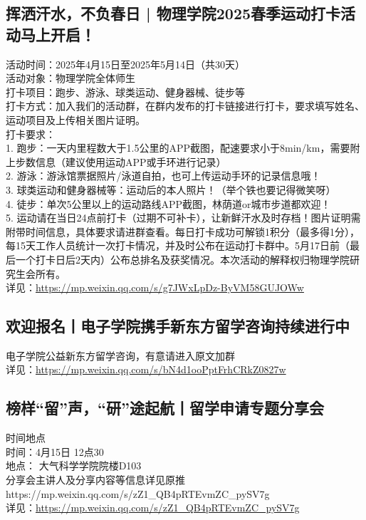 \documentclass[letterpaper, 12pt]{article}
\begin{document}
\begin{multicols}{2}
\subsection{挥洒汗水，不负春日 | 物理学院2025春季运动打卡活动马上开启！}
活动时间：2025年4月15日至2025年5月14日（共30天）
\\活动对象：物理学院全体师生
\\打卡项目：跑步、游泳、球类运动、健身器械、徒步等
\\打卡方式：加入我们的活动群，在群内发布的打卡链接进行打卡，要求填写姓名、运动项目及上传相关图片证明。
\\打卡要求：
\\1. 跑步：一天内里程数大于1.5公里的APP截图，配速要求小于8min/km，需要附上步数信息（建议使用运动APP或手环进行记录）
\\2. 游泳：游泳馆票据照片/泳道自拍，也可上传运动手环的记录信息哦！
\\3. 球类运动和健身器械等：运动后的本人照片！（举个铁也要记得微笑呀）
\\4. 徒步：单次5公里以上的运动路线APP截图，林荫道or城市步道都欢迎！
\\5. 运动请在当日24点前打卡（过期不可补卡），让新鲜汗水及时存档！图片证明需附带时间信息，具体要求请进群查看。每日打卡成功可解锁1积分（最多得1分），每15天工作人员统计一次打卡情况，并及时公布在运动打卡群中。5月17日前（最后一个打卡日后2天内）公布总排名及获奖情况。本次活动的解释权归物理学院研究生会所有。
\\详见：\url{https://mp.weixin.qq.com/s/g7JWxLpDz-ByVM58GUJOWw}

\subsection{欢迎报名丨电子学院携手新东方留学咨询持续进行中}
电子学院公益新东方留学咨询，有意请进入原文加群
\\详见：\url{https://mp.weixin.qq.com/s/bN4d1ooPptFrhCRkZ0827w}

\subsection{榜样“留”声，“研”途起航丨留学申请专题分享会}
时间地点
\\时间：4月15日 12点30
\\地点： 大气科学学院院楼D103
\\分享会主讲人及分享内容等信息详见原推https://mp.weixin.qq.com/s/zZ1\_QB4pRTEvmZC\_pySV7g
\\详见：\url{https://mp.weixin.qq.com/s/zZ1_QB4pRTEvmZC_pySV7g}



\end{multicols}
\end{document}
